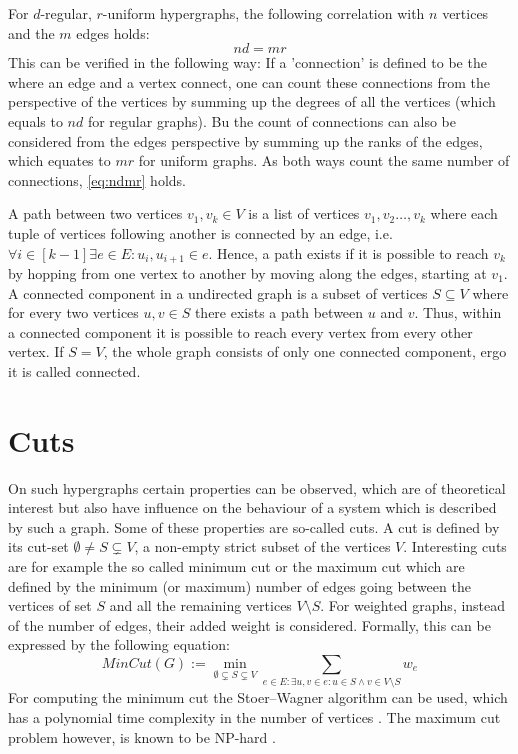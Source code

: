 For $d$-regular, $r$-uniform hypergraphs, the following correlation with $n$ vertices and the $m$ edges holds:
\begin{equation}\label{eq:ndmr}
	 n d = m r
\end{equation}
 This can be verified in the following way: If a 'connection' is defined to be the where an edge and a vertex connect, one can count these connections from the perspective of the vertices by summing up the degrees of all the vertices (which equals to $nd$ for regular graphs). Bu the count of connections can also be considered from the edges perspective by summing up the ranks of the edges, which equates to $mr$ for uniform graphs. As both ways count the same number of connections, \cref{eq:ndmr} holds.
 
 
A path between two vertices $v_1,v_k\in V$ is a list of vertices $v_1, v_2 \ldots , v_k$ where each tuple of vertices following another is connected by an edge, i.e. $\forall i \in [k-1]\exists e \in E: u_i, u_{i+1} \in e  $. Hence, a path exists if it is possible to reach $v_k$ by hopping from one vertex to another by moving along the edges, starting at $v_1$.
A connected component in a undirected graph is a subset of vertices $S\subseteq V$  where for every two vertices $u,v \in S$ there exists a path between $u$ and $v$. Thus, within a connected component it is possible to reach every vertex from every other vertex. If $S=V$, the whole graph consists of only one connected component, ergo it is called connected.

\section{Cuts}
On such hypergraphs certain properties can be observed, which are of theoretical interest but also have influence on the behaviour of a system which is described by such a graph. Some of these properties are so-called cuts. A cut is defined by its cut-set $\emptyset \neq S \subsetneq V$, a non-empty strict subset of the vertices $V$. Interesting cuts are for example the so called minimum cut or the maximum cut which are defined by the minimum (or maximum) number of edges going between the vertices of set $S$ and all the remaining vertices $V \setminus S$. For weighted graphs, instead of the number of edges, their added weight is considered. Formally, this can be expressed by the following equation: \begin{equation}
MinCut(G) := \min_{\emptyset \subsetneq S \subsetneq V} \sum_{e\in E:\exists u, v \in e: u \in S \land v \in V \setminus S } w_e
\end{equation}
For computing the minimum cut the Stoer–Wagner algorithm can be used, which has a polynomial time complexity in the number of vertices \cite{stoer1997simple}.
The maximum cut problem however, is known to be NP-hard \cite{karp1972reducibility}.

